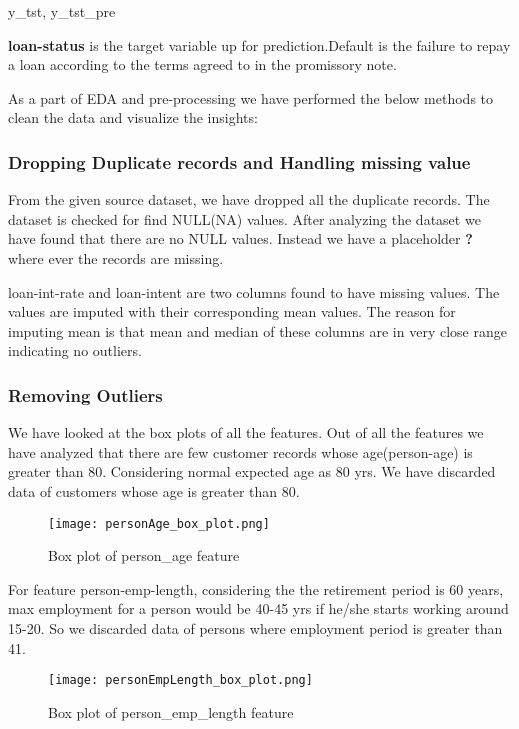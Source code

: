y_tst, y_tst_pre\documentclass[12pt]{article}
\begin{document}
\textbf{loan-status} is the target variable up for prediction.Default is the failure to repay a loan according to the terms agreed to in the promissory note.

As a part of EDA and pre-processing we have performed the below methods to clean the data and visualize the insights:

\subsubsection{Dropping Duplicate records and Handling missing value}
From the given source dataset, we have dropped all the duplicate records. The dataset is checked for find NULL(NA) values. After analyzing the dataset we have found that there are no NULL values. Instead we have a placeholder \textbf{?} where ever the records are missing.

loan-int-rate and loan-intent are two columns found to have missing values.  The values are imputed with their corresponding mean values. The reason for imputing mean is that mean and median of these columns are in very close range indicating no outliers.

\subsubsection{Removing Outliers}We have looked at the box plots of all the features. Out of all the features we have analyzed that there are few customer records whose age(person-age) is greater than 80. Considering normal expected age as 80 yrs. We have discarded data of customers whose age is greater than 80.

\begin{figure}[h] %
\centering
\texttt{[image: personAge\_box\_plot.png]}
\caption{Box plot of person\_age feature}
\end{figure}

For feature person-emp-length, considering the the retirement period is 60 years, max employment for a person would be 40-45 yrs if he/she starts working around 15-20. So we discarded data of persons where employment period is greater than 41.

\begin{figure}[h] %
\centering
\texttt{[image: personEmpLength\_box\_plot.png]}
\caption{Box plot of person\_emp\_length feature}
\end{figure}
\end{document}
